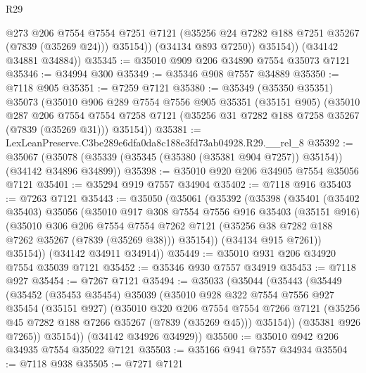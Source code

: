 \begin{lexlean}{R29}
\begin{coremodule}
                @273
                @206
                @7554
                @7554
                @7251
                @7121
                (@35256 @24 @7282 @188 @7251 @35267 (@7839 (@35269 @24)))
                @35154))
            (@34134 @893 @7250))
          @35154))
      (@34142 @34881 @34884))
@35345 := @35010 @909 @206 @34890 @7554 @35073 @7121
@35346 := @34994 @300
@35349 := @35346 @908 @7557 @34889
@35350 := @7118 @905
@35351 := @7259 @7121
@35380 := @35349
    (@35350 @35351)
    @35073
    (@35010
      @906
      @289
      @7554
      @7556
      @905
      @35351
      (@35151 @905)
      (@35010
        @287
        @206
        @7554
        @7554
        @7258
        @7121
        (@35256 @31 @7282 @188 @7258 @35267 (@7839 (@35269 @31)))
        @35154))
@35381 := LexLeanPreserve.C3be289e6dfa0da8c188e3fd73ab04928.R29.__rel_8
@35392 := @35067
    (@35078 (@35339 (@35345 (@35380 (@35381 @904 @7257)) @35154)) (@34142 @34896 @34899))
@35398 := @35010 @920 @206 @34905 @7554 @35056 @7121
@35401 := @35294 @919 @7557 @34904
@35402 := @7118 @916
@35403 := @7263 @7121
@35443 := @35050
    (@35061
      (@35392
        (@35398
          (@35401
            (@35402 @35403)
            @35056
            (@35010
              @917
              @308
              @7554
              @7556
              @916
              @35403
              (@35151 @916)
              (@35010
                @306
                @206
                @7554
                @7554
                @7262
                @7121
                (@35256 @38 @7282 @188 @7262 @35267 (@7839 (@35269 @38)))
                @35154))
            (@34134 @915 @7261))
          @35154))
      (@34142 @34911 @34914))
@35449 := @35010 @931 @206 @34920 @7554 @35039 @7121
@35452 := @35346 @930 @7557 @34919
@35453 := @7118 @927
@35454 := @7267 @7121
@35494 := @35033
    (@35044
      (@35443
        (@35449
          (@35452
            (@35453 @35454)
            @35039
            (@35010
              @928
              @322
              @7554
              @7556
              @927
              @35454
              (@35151 @927)
              (@35010
                @320
                @206
                @7554
                @7554
                @7266
                @7121
                (@35256 @45 @7282 @188 @7266 @35267 (@7839 (@35269 @45)))
                @35154))
            (@35381 @926 @7265))
          @35154))
      (@34142 @34926 @34929))
@35500 := @35010 @942 @206 @34935 @7554 @35022 @7121
@35503 := @35166 @941 @7557 @34934
@35504 := @7118 @938
@35505 := @7271 @7121

\end{coremodule}
\end{lexlean}

